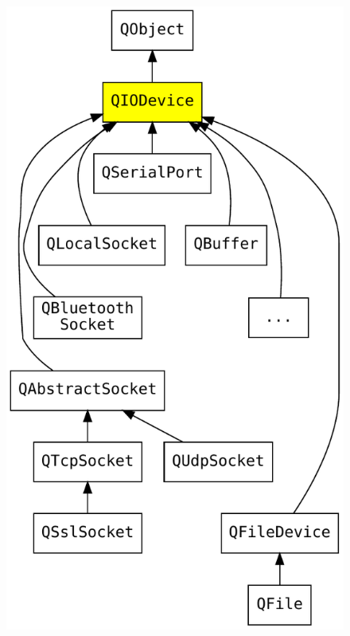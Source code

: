 \begin{frame}[fragile]
\begin{columns}
\begin{column}{0.32\textwidth}
\begin{figure}[!t]
    \includegraphics[width=\textwidth]{images/qiodevice.pdf}
    \end{figure}
    \end{column}
  \end{columns}
\end{frame}

